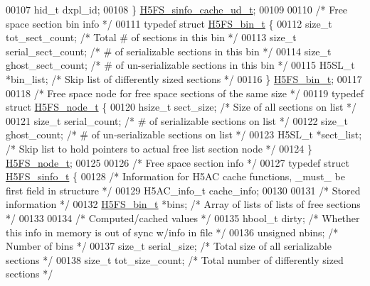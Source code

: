 \begin{DoxyCode}
00107     hid\_t dxpl\_id;
00108 \} \hyperlink{struct_h5_f_s__sinfo__cache__ud__t}{H5FS\_sinfo\_cache\_ud\_t};
00109 
00110 \textcolor{comment}{/* Free space section bin info */}
00111 \textcolor{keyword}{typedef} \textcolor{keyword}{struct }\hyperlink{struct_h5_f_s__bin__t}{H5FS\_bin\_t} \{
00112     \textcolor{keywordtype}{size\_t} tot\_sect\_count;      \textcolor{comment}{/* Total # of sections in this bin */}
00113     \textcolor{keywordtype}{size\_t} serial\_sect\_count;   \textcolor{comment}{/* # of serializable sections in this bin */}
00114     \textcolor{keywordtype}{size\_t} ghost\_sect\_count;    \textcolor{comment}{/* # of un-serializable sections in this bin */}
00115     H5SL\_t *bin\_list;           \textcolor{comment}{/* Skip list of differently sized sections */}
00116 \} \hyperlink{struct_h5_f_s__bin__t}{H5FS\_bin\_t};
00117 
00118 \textcolor{comment}{/* Free space node for free space sections of the same size */}
00119 \textcolor{keyword}{typedef} \textcolor{keyword}{struct }\hyperlink{struct_h5_f_s__node__t}{H5FS\_node\_t} \{
00120     hsize\_t sect\_size;          \textcolor{comment}{/* Size of all sections on list */}
00121     \textcolor{keywordtype}{size\_t} serial\_count;        \textcolor{comment}{/* # of serializable sections on list */}
00122     \textcolor{keywordtype}{size\_t} ghost\_count;         \textcolor{comment}{/* # of un-serializable sections on list */}
00123     H5SL\_t *sect\_list;          \textcolor{comment}{/* Skip list to hold pointers to actual free list section node */}
00124 \} \hyperlink{struct_h5_f_s__node__t}{H5FS\_node\_t};
00125 
00126 \textcolor{comment}{/* Free space section info */}
00127 \textcolor{keyword}{typedef} \textcolor{keyword}{struct }\hyperlink{struct_h5_f_s__sinfo__t}{H5FS\_sinfo\_t} \{
00128     \textcolor{comment}{/* Information for H5AC cache functions, \_must\_ be first field in structure */}
00129     H5AC\_info\_t cache\_info;
00130 
00131 \textcolor{comment}{/* Stored information */}
00132     \hyperlink{struct_h5_f_s__bin__t}{H5FS\_bin\_t} *bins;           \textcolor{comment}{/* Array of lists of lists of free sections   */}
00133 
00134 \textcolor{comment}{/* Computed/cached values */}
00135     hbool\_t dirty;              \textcolor{comment}{/* Whether this info in memory is out of sync w/info in file */}
00136     \textcolor{keywordtype}{unsigned} nbins;             \textcolor{comment}{/* Number of bins                             */}
00137     \textcolor{keywordtype}{size\_t} serial\_size;         \textcolor{comment}{/* Total size of all serializable sections    */}
00138     \textcolor{keywordtype}{size\_t} tot\_size\_count;      \textcolor{comment}{/* Total number of differently sized sections */}

\end{DoxyCode}
